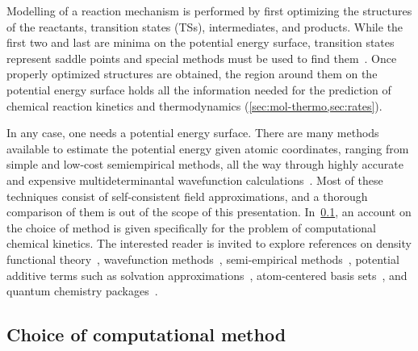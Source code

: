 Modelling of a reaction mechanism is performed
by first optimizing the structures of the reactants,
transition states (TSs),
intermediates,
and
products.
While the first two and last are minima on the potential energy surface,
transition states represent saddle points and
special methods must be used
to find them~\cite{Banerjee_1985,Schlegel_1987,Peng_1993,Peng_1996,Henkelman_2000a,Henkelman_2000b,Henkelman_2002,Mauro_2005,Sheppard_2008,Zimmerman_2013a,Zimmerman_2013b,Zimmerman_2015,Jafari_2017}.
Once properly optimized structures are obtained,
the region around them on the potential energy surface holds
all the information needed
for the prediction of chemical reaction kinetics and thermodynamics (\cref{sec:mol-thermo,sec:rates}).

In any case,
one needs a potential energy surface.
There are many methods available to estimate the potential energy given atomic coordinates,
ranging from simple and low-cost semiempirical methods,
all the way through highly accurate and expensive multideterminantal wavefunction calculations~\cite{Perdew_2001}.
Most of these techniques consist of self-consistent field approximations,
and a thorough comparison of them is out of the scope of this presentation.
In~\cref{sec:choice-of-method},
an account on the choice of method is given specifically
for the problem of computational chemical kinetics.
The interested reader is invited to explore references
on density functional theory~\cite{Hohenberg_1964,Kohn_1965,Perdew_1996,Perdew_1997,Ernzerhof_1999,Adamo_1999,Chai_2008a,Chai_2008b,Goerigk_2011,Arago_2011,Salzner_2011,Burns_2011,Minenkov_2012,Perdew_2014,Kryachko_2014,Yu_2016,DFT2016_poll},
wavefunction methods~\cite{Szabo_1996,Riplinger_2013,Riplinger_2016},
semi-empirical methods~\cite{MOPAC,Bannwarth_2020},
potential additive terms such
as solvation approximations~\cite{Marenich_2009,Marenich_2012},
atom-centered basis sets~\cite{Ditchfield_1971,Hehre_1972,Hariharan_1973,Hariharan_1974,Gordon_1980,Francl_1982,Clark_1983,Frisch_1984,Binning_1990,Szabo_1996,Helgaker_1997,Blaudeau_1997,Rassolov_1998,Rassolov_2001,Jensen_2012,Hill_2012},
and quantum chemistry packages~\cite{g09,Neese_2017}.

\subsection{Choice of computational method}%
\label{sec:choice-of-method}


